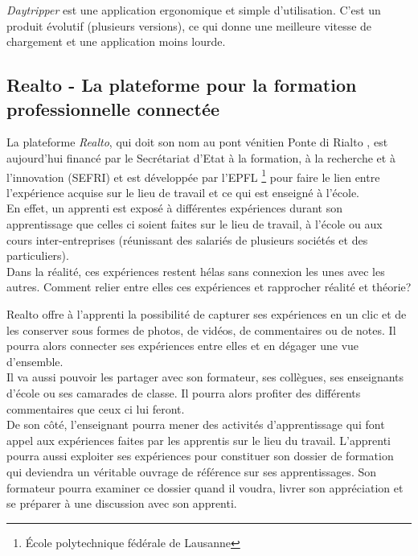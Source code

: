 \documentclass{report}
\begin{document}
\emph{Daytripper} est une application ergonomique et simple d'utilisation. C'est un produit évolutif (plusieurs versions), ce qui donne une meilleure vitesse de chargement et une application moins lourde.




\subsection{Realto - La plateforme pour la formation professionnelle connectée}
La plateforme \emph{Realto}, qui doit son nom au pont vénitien \og Ponte di Rialto \fg, est aujourd'hui financé par le Secrétariat d'Etat à la formation, à la recherche et à l'innovation (SEFRI) et est développée par l'EPFL \footnote{École polytechnique fédérale de Lausanne} pour faire le lien entre l'expérience acquise sur le lieu de travail et ce qui est enseigné à l'école. 
\\

En effet, un apprenti est exposé à différentes expériences durant son apprentissage que celles ci soient faites sur le lieu de travail, à l'école ou aux cours inter-entreprises (réunissant des salariés de plusieurs sociétés et des particuliers).\\
Dans la réalité, ces expériences restent hélas sans connexion les unes avec les autres. Comment relier entre elles ces expériences et rapprocher réalité et théorie?

Realto offre à l'apprenti la possibilité de capturer ses expériences en un clic et de les conserver sous formes de photos, de vidéos, de commentaires ou de notes. Il pourra alors connecter ses expériences entre elles et en dégager une vue d'ensemble.\\

Il va aussi pouvoir les partager avec son formateur, ses collègues, ses enseignants d'école ou ses camarades de classe. Il pourra alors profiter des différents commentaires que ceux ci lui feront.\\
De son côté, l'enseignant pourra mener des activités d'apprentissage qui font appel aux expériences faites par les apprentis sur le lieu du travail. L'apprenti pourra aussi exploiter ses expériences pour constituer son dossier de formation qui deviendra un véritable ouvrage de référence sur ses apprentissages. Son formateur pourra examiner ce dossier quand il voudra, livrer son appréciation et se préparer à une discussion avec son apprenti.\\
\end{document}
